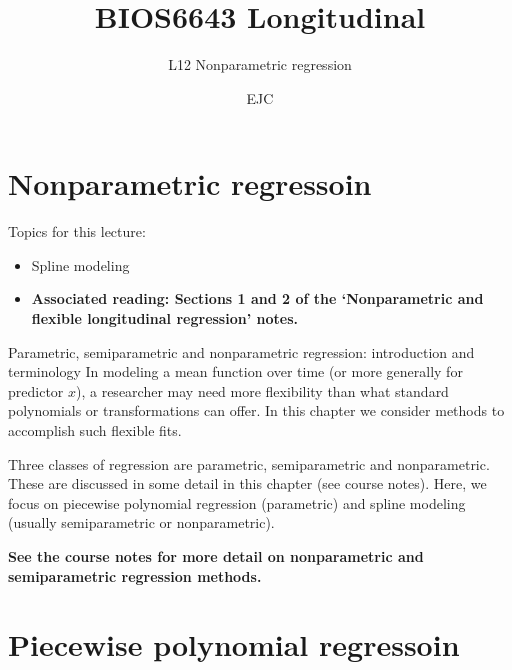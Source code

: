 \documentclass[
  9pt,
  ignorenonframetext,
]{beamer}
\title{BIOS6643 Longitudinal}
\subtitle{L12 Nonparametric regression}
\author{EJC}
\date{}
\institute{Department of Biostatistics \& Informatics}
\providecommand{\tightlist}{%
  \setlength{\itemsep}{0pt}\setlength{\parskip}{0pt}}
\begin{document}
\frame{\titlepage}

\begin{frame}[allowframebreaks]
  \tableofcontents[hideallsubsections]
\end{frame}
\hypertarget{nonparametric-regressoin}{%
\section{Nonparametric regressoin}\label{nonparametric-regressoin}}

\begin{frame}{Topics for this lecture:}
\protect\hypertarget{topics-for-this-lecture}{}
\begin{itemize}
\tightlist
\item
  Spline modeling
\end{itemize}

\vspace{\baselineskip}

\begin{itemize}
\tightlist
\item
  \textbf{Associated reading: Sections 1 and 2 of the `Nonparametric and
  flexible longitudinal regression' notes.}
\end{itemize}
\end{frame}

\begin{frame}{Parametric, semiparametric and nonparametric regression:
introduction and terminology}
\protect\hypertarget{parametric-semiparametric-and-nonparametric-regression-introduction-and-terminology}{}
In modeling a mean function over time (or more generally for predictor
\(x\)), a researcher may need more flexibility than what standard
polynomials or transformations can offer. In this chapter we consider
methods to accomplish such flexible fits.

Three classes of regression are parametric, semiparametric and
nonparametric. These are discussed in some detail in this chapter (see
course notes). Here, we focus on piecewise polynomial regression
(parametric) and spline modeling (usually semiparametric or
nonparametric).

\textbf{See the course notes for more detail on nonparametric and
semiparametric regression methods.}
\end{frame}

\hypertarget{piecewise-polynomial-regressoin}{%
\section{Piecewise polynomial
regressoin}\label{piecewise-polynomial-regressoin}}
\end{document}
